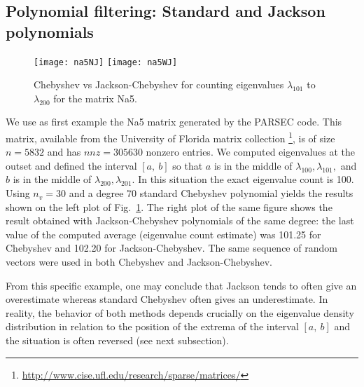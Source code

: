 \documentclass[12pt]{article}		\usepackage{tabls,multirow}
\newcommand{\ab}{[a, \ b]}
\begin{document}
\subsection{Polynomial filtering: Standard and Jackson polynomials}
\label{sec:jackpoly}

\begin{figure}[hbt]
\begin{center} 
\texttt{[image: na5NJ]} 
\texttt{[image: na5WJ]} 
\end{center}
\caption{Chebyshev vs Jackson-Chebyshev for counting eigenvalues
$\lambda_{101} $ to $\lambda_{200} $  for the matrix Na5.
\label{fig:chebNa5}}
\end{figure}

We use as first example the Na5 matrix generated by the PARSEC
code. This matrix, available from the University of Florida matrix
collection
\footnote{\url{http://www.cise.ufl.edu/research/sparse/matrices/}}, is
of size $n = 5832$ and has $ nnz = 305630$ nonzero entries.  We
computed eigenvalues at the outset and defined the interval $\ab$ so
that $a$ is in the middle of $\lambda_{100}, \lambda_{101}, $ and $b$
is in the middle of $\lambda_{200}, \lambda_{201}$. In this situation
the exact eigenvalue count is 100. Using $n_v = 30$ and a degree 70
standard Chebyshev polynomial yields the results shown on the left
plot of Fig.~\ref{fig:chebNa5}. The right plot of the same figure
shows the result obtained with Jackson-Chebyshev polynomials of the
same degree: the last value of the computed average (eigenvalue count
estimate) was 101.25 for Chebyshev and 102.20 for
Jackson-Chebyshev. The same sequence of random vectors were used in
both Chebyshev and Jackson-Chebyshev.

From this specific example, one may conclude that Jackson tends to
often give an overestimate whereas standard Chebyshev often gives an
underestimate. In reality, the behavior of both methods depends
crucially on the eigenvalue density distribution in relation to the
position of the extrema of the interval $\ab$ and the situation is
often reversed (see next subsection).
\end{document}
